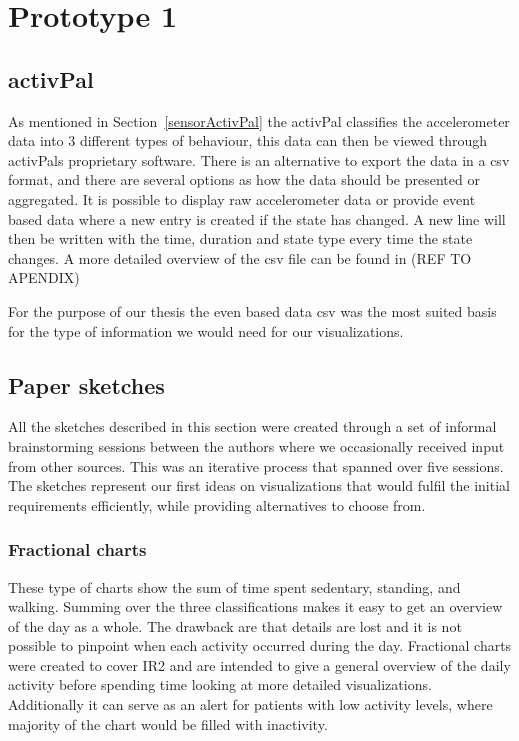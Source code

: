 \chapter{Prototype 1}

\section{activPal}
As mentioned in Section~\ref{sensorActivPal} the activPal classifies the accelerometer data into 3 different types of behaviour, this data can then be viewed through activPals proprietary software. There is an alternative to export the data in a \gls{csv} format, and there are several options as how the data should be presented or aggregated. It is possible to display raw accelerometer data or provide event based data where a new entry is created if the state has changed. A new line will then be written with the time, duration and state type every time the state changes. A more detailed overview of the \gls{csv} file can be found in (REF TO APENDIX)

For the purpose of our thesis the even based data \gls{csv} was the most suited basis for the type of information we would need for our visualizations.



\section{Paper sketches}
All the sketches described in this section were created through a set of informal brainstorming sessions between the authors where we occasionally received input from other sources. This was an iterative process that spanned over five sessions. The sketches represent our first ideas on visualizations that would fulfil the initial requirements efficiently, while providing alternatives to choose from. 

\subsection{Fractional charts}
These type of charts show the sum of time spent sedentary, standing, and walking. Summing over the three classifications makes it easy to get an overview of the day as a whole. The drawback are that details are lost and it is not possible to pinpoint when each activity occurred during the day. Fractional charts were created to cover IR2 and are intended to give a general overview of the daily activity before spending time looking at more detailed visualizations. Additionally it can serve as an alert for patients with low activity levels, where majority of the chart would be filled with inactivity.

